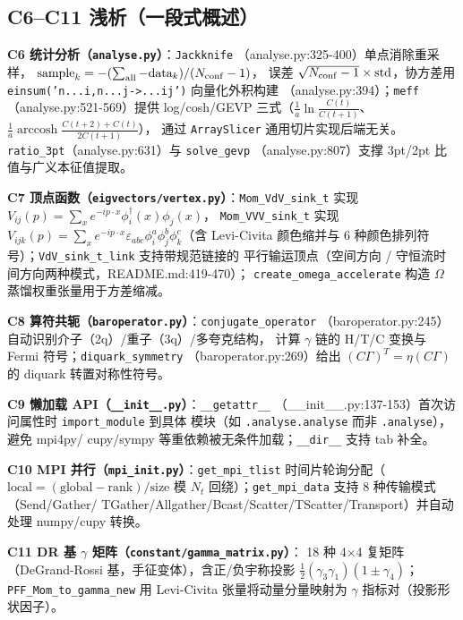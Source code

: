 \documentclass[UTF8]{ctexart}
\begin{document}
\subsection{C6--C11 浅析（一段式概述）}

\textbf{C6 统计分析（\texttt{analyse.py}）}：\texttt{Jackknife}
（analyse.py:325-400）单点消除重采样，
$\text{sample}_k = -(\sum_{\rm all} - \text{data}_k)/(N_{\rm conf}-1)$，
误差 $\sqrt{N_{\rm conf}-1}\times\text{std}$，协方差用
\texttt{einsum('n...i,n...j->...ij')} 向量化外积构建
（analyse.py:394）；\texttt{meff}（analyse.py:521-569）提供
log/cosh/GEVP 三式（$\frac{1}{a}\ln\frac{C(t)}{C(t+1)}$、
$\frac{1}{a}\operatorname{arccosh}\frac{C(t+2)+C(t)}{2C(t+1)}$），
通过 \texttt{ArraySlicer} 通用切片实现后端无关。
\texttt{ratio\_3pt}（analyse.py:631）与 \texttt{solve\_gevp}
（analyse.py:807）支撑 3pt/2pt 比值与广义本征值提取。

\textbf{C7 顶点函数（\texttt{eigvectors/vertex.py}）}：\texttt{Mom\_VdV\_sink\_t}
实现 $V_{ij}(p)=\sum_x e^{-ip\cdot x}\phi_i^\dagger(x)\phi_j(x)$，
\texttt{Mom\_VVV\_sink\_t} 实现 $V_{ijk}(p)=\sum_x e^{-ip\cdot x}
\varepsilon_{abc}\phi_i^a\phi_j^b\phi_k^c$（含 Levi-Civita 颜色缩并与
6 种颜色排列符号）；\texttt{VdV\_sink\_t\_link} 支持带规范链接的
平行输运顶点（空间方向 / 守恒流时间方向两种模式，README.md:419-470）；
\texttt{create\_omega\_accelerate} 构造 $\Omega$ 蒸馏权重张量用于方差缩减。

\textbf{C8 算符共轭（\texttt{baroperator.py}）}：\texttt{conjugate\_operator}
（baroperator.py:245）自动识别介子（2q）/重子（3q）/多夸克结构，
计算 $\gamma$ 链的 H/T/C 变换与 Fermi 符号；\texttt{diquark\_symmetry}
（baroperator.py:269）给出 $(C\Gamma)^T = \eta (C\Gamma)$ 的
diquark 转置对称性符号。

\textbf{C9 懒加载 API（\texttt{\_\_init\_\_.py}）}：\texttt{\_\_getattr\_\_}
（\_\_init\_\_.py:137-153）首次访问属性时 \texttt{import\_module} 到具体
模块（如 \texttt{.analyse.analyse} 而非 \texttt{.analyse}），避免 mpi4py/
cupy/sympy 等重依赖被无条件加载；\texttt{\_\_dir\_\_} 支持 tab 补全。

\textbf{C10 MPI 并行（\texttt{mpi\_init.py}）}：\texttt{get\_mpi\_tlist}
时间片轮询分配（$\text{local} = (\text{global} - \text{rank})/\text{size}$
模 $N_t$ 回绕）；\texttt{get\_mpi\_data} 支持 8 种传输模式（Send/Gather/
TGather/Allgather/Bcast/Scatter/TScatter/Transport）并自动处理
numpy/cupy 转换。

\textbf{C11 DR 基 $\gamma$ 矩阵（\texttt{constant/gamma\_matrix.py}）}：
18 种 4$\times$4 复矩阵（DeGrand-Rossi 基，手征变体），含正/负宇称投影
$\frac12(\gamma_3\gamma_1)(1\pm\gamma_4)$；\texttt{PFF\_Mom\_to\_gamma\_new}
用 Levi-Civita 张量将动量分量映射为 $\gamma$ 指标对（投影形状因子）。
\end{document}
